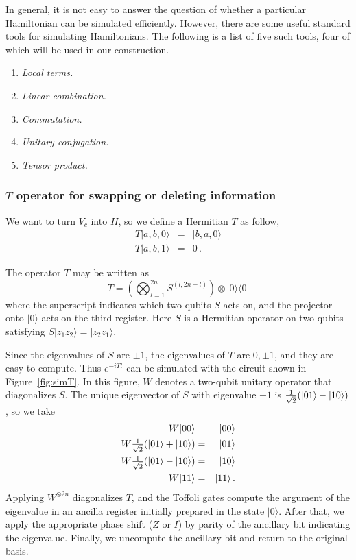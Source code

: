 \documentclass[aps,11pt,twoside,nofootinbib,tightenlines,superscriptaddress,preprintnumbers]{revtex4}
\newcommand{\<}{\langle}
\renewcommand{\>}{\rangle}
\newcommand{\be}{\begin{equation}}
\newcommand{\ee}{\end{equation}}
\newcommand{\bea}{\begin{eqnarray}}
\newcommand{\eea}{\end{eqnarray}}
\newenvironment{proof sketch}
{\trivlist\item\noindent{\bf Proof sketch}~}
{\qed\endtrivlist}
\begin{document}
In general, it is not easy to answer the question of whether a particular Hamiltonian can be simulated efficiently. However, there are some useful standard tools for
simulating Hamiltonians.  The following is a list of five such tools, four
of which will be used in our construction. \cite{NC00}

\begin{enumerate}
\item {\em Local terms.}
\item {\em Linear combination.}  
\item {\em Commutation.} 
\item {\em Unitary conjugation.}
\item {\em Tensor product.} 
\end{enumerate}

\subsubsection{$T$ operator for swapping or deleting information}

We want to turn $V_c$ into $H$, so we define a Hermitian $T$ as follow,
\bea
  T |a, b, 0\> &=& |b, a, 0\> \\
  T |a, b, 1\> &=& 0
\,.
\eea

The operator $T$ may be written as
\be
  T = \left( \bigotimes_{l=1}^{2n} S^{(l,2n+l)} \right) \otimes |0\>\<0|
\label{eq:swap}
\ee
where the superscript indicates which two qubits $S$ acts on, and the
projector onto $|0\>$ acts on the third register.  Here $S$ is a Hermitian
operator on two qubits satisfying $S |z_1 z_2\> = |z_2 z_1\>$.

Since the eigenvalues of $S$ are $\pm1$, the eigenvalues of $T$ are $0,\pm1$, and
they are easy to compute. Thus $e^{-i T t}$ can be simulated with the
circuit shown in Figure~\ref{fig:simT}.  In this figure, $W$ denotes a
two-qubit unitary operator that diagonalizes $S$.  The unique eigenvector
of $S$ with eigenvalue $-1$ is ${1 \over \sqrt2}(|01\>-|10\>)$, so we take
\bea
  W |00\> &=& |00\> \\
  W {\textstyle{1 \over \sqrt2}}(|01\> + |10\>) &=& |01\> \\
  W {\textstyle{1 \over \sqrt2}}(|01\> - |10\>) &=& |10\> \\
  W |11\> &=& |11\>
\,.
\eea
Applying $W^{\otimes 2n}$ diagonalizes $T$, and the Toffoli gates compute
the argument of the eigenvalue in an ancilla register initially prepared
in the state $|0\>$. After that, we apply the appropriate phase shift ($Z$ or $I$) by parity of the ancillary bit indicating the eigenvalue. Finally, we uncompute the ancillary bit and return to the original basis.
\end{document}
